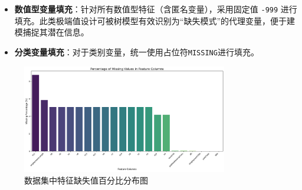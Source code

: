\documentclass{thuemp}
\begin{document}
\begin{itemize}
  \item \textbf{数值型变量填充}：针对所有数值型特征（含匿名变量），采用固定值 \texttt{-999} 进行填充。此类极端值设计可被树模型有效识别为“缺失模式”的代理变量，便于建模捕捉其潜在信息。
  \item \textbf{分类变量填充}：对于类别变量，统一使用占位符\texttt{MISSING}进行填充。
\end{itemize}

\begin{figure}[H]
    \centering
    \includegraphics[width=0.8\textwidth]{image/results/__results___files/__results___9_1.png} %
    \caption{数据集中特征缺失值百分比分布图}
    \label{fig:missing_values}
\end{figure}
\end{document}
